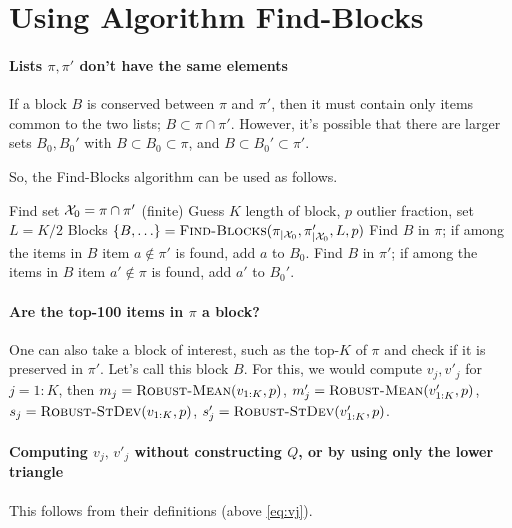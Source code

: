 \documentclass[10pt]{article}
\begin{document}
\section{Using Algorithm {\sc Find-Blocks}}

\paragraph{Lists $\pi,\pi'$  don't have the same elements}
If a block $B$ is conserved between $\pi$ and $\pi'$, then it must contain only items common to the two lists; $B\subset \pi\cap \pi'$. However, it's possible that there are larger sets $B_0,B_0'$ with  $B\subset B_0\subset \pi$, and   $B\subset B_0'\subset \pi'$.

So, the {\sc Find-Blocks} algorithm can be used as follows.

\begin{algorithm}{}
\begin{algorithmic}[1]
  \State Find set ${\mathcal X}_0=\pi\cap \pi'$ (finite)
  \State Guess $K$ length of block, $p$ outlier fraction, set $L=K/2$
  \State Blocks $\{B,\ldots\}=\text{\sc Find-Blocks}(\pi_{|{\mathcal X}_0},\pi'_{|{\mathcal X}_0},L,p)$
  \State Find $B$ in $\pi$; if among the items in $B$ item $a\not\in\pi'$ is found, add $a$ to $B_0$. 
  \State Find $B$ in $\pi'$; if among the items in $B$ item $a'\not\in\pi$ is found, add $a'$ to $B_0'$. 
  \EndFor
\end{algorithmic}
\end{algorithm}

\paragraph{Are the top-100 items in $\pi$ a block?}
One can also take a block of interest, such as the top-$K$ of $\pi$
and check if it is preserved in $\pi'$. Let's call this block $B$. For
this, we would compute $v_j,v'_j$ for $j=1:K$, then
$m_j=\mbox{\sc Robust-Mean}(v_{1:K},p)$, $m'_j=\mbox{\sc Robust-Mean}(v'_{1:K},p)$,
$s_j=\mbox{\sc Robust-StDev}(v_{1:K},p)$, $s'_j=\mbox{\sc Robust-StDev}(v'_{1:K},p)$.

\paragraph{Computing $v_j,\,v'_j$  without constructing $Q$, or by using only the lower triangle}  This follows from their definitions (above \eqref{eq:vj}). 
\end{document}
